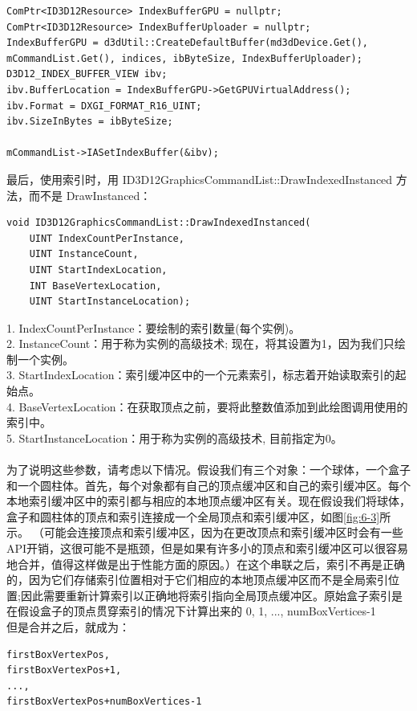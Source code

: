 \documentclass[11pt,a4paper,oldfontcommands]{memoir}
\begin{document}
{\begin{flushleft}
\begin{lstlisting}
ComPtr<ID3D12Resource> IndexBufferGPU = nullptr;
ComPtr<ID3D12Resource> IndexBufferUploader = nullptr;
IndexBufferGPU = d3dUtil::CreateDefaultBuffer(md3dDevice.Get(), mCommandList.Get(), indices, ibByteSize, IndexBufferUploader);
D3D12_INDEX_BUFFER_VIEW ibv;
ibv.BufferLocation = IndexBufferGPU->GetGPUVirtualAddress();
ibv.Format = DXGI_FORMAT_R16_UINT;
ibv.SizeInBytes = ibByteSize;

mCommandList->IASetIndexBuffer(&ibv);
\end{lstlisting}
最后，使用索引时，用 ID3D12GraphicsCommandList::DrawIndexedInstanced 方法，而不是 DrawInstanced：\\
\begin{lstlisting}
void ID3D12GraphicsCommandList::DrawIndexedInstanced(
    UINT IndexCountPerInstance,
    UINT InstanceCount,
    UINT StartIndexLocation,
    INT BaseVertexLocation,
    UINT StartInstanceLocation);
\end{lstlisting}
1. IndexCountPerInstance：要绘制的索引数量(每个实例)。\\
2. InstanceCount：用于称为实例的高级技术; 现在，将其设置为1，因为我们只绘制一个实例。\\
3. StartIndexLocation：索引缓冲区中的一个元素索引，标志着开始读取索引的起始点。\\
4. BaseVertexLocation：在获取顶点之前，要将此整数值添加到此绘图调用使用的索引中。\\
5. StartInstanceLocation：用于称为实例的高级技术, 目前指定为0。\\
~\\
为了说明这些参数，请考虑以下情况。假设我们有三个对象：一个球体，一个盒子和一个圆柱体。首先，每个对象都有自己的顶点缓冲区和自己的索引缓冲区。每个本地索引缓冲区中的索引都与相应的本地顶点缓冲区有关。现在假设我们将球体，盒子和圆柱体的顶点和索引连接成一个全局顶点和索引缓冲区，如图\ref{fig:6-3}所示。 （可能会连接顶点和索引缓冲区，因为在更改顶点和索引缓冲区时会有一些API开销，这很可能不是瓶颈，但是如果有许多小的顶点和索引缓冲区可以很容易地合并，值得这样做是出于性能方面的原因。）在这个串联之后，索引不再是正确的，因为它们存储索引位置相对于它们相应的本地顶点缓冲区而不是全局索引位置;因此需要重新计算索引以正确地将索引指向全局顶点缓冲区。原始盒子索引是在假设盒子的顶点贯穿索引的情况下计算出来的 0, 1, ..., numBoxVertices-1\\
但是合并之后，就成为：\\
\begin{lstlisting}
firstBoxVertexPos,
firstBoxVertexPos+1,
...,
firstBoxVertexPos+numBoxVertices-1
\end{lstlisting}
 

\end{flushleft}}
\end{document}
